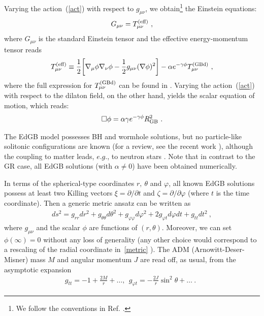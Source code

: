 \documentclass[12pt]{article}
\begin{document}
 
Varying the action~(\ref{act}) with respect to $g_{\mu\nu}$, we obtain\footnote{We follow the
conventions in Ref. \cite{Guo:2008hf}.  }
the  Einstein equations:
\begin{eqnarray}
\label{EGB-eq1}
 G_{\mu\nu}= T_{\mu\nu}^{\rm (eff)} \ ,
 \end{eqnarray} 
 where $G_{\mu\nu}$ is the standard Einstein tensor and the effective energy-momentum tensor reads
  \begin{eqnarray}
\label{Teff}
 T_{\mu\nu}^{\rm (eff)}\equiv \frac12\biggl[\nabla_{\mu}\phi\nabla_{\nu} \phi -\frac12 g_{\mu\nu}(\nabla\phi)^2\biggr]
-\alpha  e^{-\gamma\phi}T_{\mu\nu}^{\rm (GBd)} \ ,
 \end{eqnarray} 
 where the full expression for $T_{\mu\nu}^{\rm (GBd)}$ can be found in \cite{Kleihaus:2015aje}. Varying the action~(\ref{act}) with respect to the dilaton field, on the other hand, yields the scalar equation of motion, which reads:
%
\begin{eqnarray}
\label{dil-eq}
\Box  \phi =\alpha  \gamma e^{-\gamma\phi}  R^2_{\rm GB} \ .
\end{eqnarray} 

The EdGB model possesses BH and wormhole \cite{Kanti:2011jz} solutions, 
but no particle-like
solitonic configurations are known 
(for a review, see the recent work \cite{Blazquez-Salcedo:2016yka}),
although the coupling to matter leads, $e.g.$, to neutron stars
\cite{Pani:2011xm,Kleihaus:2016dui}.
Note that in contrast to the GR case, all  EdGB  solutions (with $\alpha\neq 0$)
 have been obtained numerically. 

In terms of the spherical-type coordinates 
$r,~\theta$ and $\varphi$, 
all known EdGB solutions possess at least two Killing vectors 
$\xi=\partial/\partial t$ and $ \zeta=\partial/\partial \varphi$
(where $t$ is the time coordinate).
Then a generic metric ansatz 
can be written as
\begin{eqnarray}
\label{metric}
ds^2=g_{rr}dr^2+g_{\theta\theta}d\theta^2+g_{\varphi\varphi}d\varphi^2+2 g_{\varphi t} d\varphi dt+g_{tt}dt^2~,
\end{eqnarray}
where 
$g_{\mu \nu}$ and the scalar $\phi$
are functions of $(r,\theta)$. Moreover, we can set $\phi(\infty)=0$ without any loss of generality {(any other choice would correspond to a rescaling of the radial coordinate in~\eqref{metric} \cite{Kleihaus:2015aje})}. 
The ADM (Arnowitt-Deser-Misner)  mass $M$ and angular momentum $J$ 
are read off, as usual, from the asymptotic expansion 
\begin{eqnarray}
\label{asym}
g_{tt} =-1+\frac{2M}{r}+\dots,~~g_{\varphi t}=-\frac{2J}{r}\sin^2\theta+\dots~.~~
\end{eqnarray}
\end{document}
